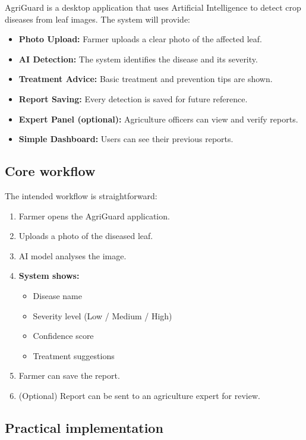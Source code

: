 \documentclass[11pt,a4paper]{article}
\begin{document}
AgriGuard is a desktop application that uses Artificial Intelligence to detect crop diseases from leaf images.
The system will provide:

\begin{itemize}[leftmargin=0.6cm]

    \item \textbf{Photo Upload:} Farmer uploads a clear photo of the affected leaf.
    \item \textbf{AI Detection:} The system identifies the disease and its severity.
    \item \textbf{Treatment Advice:} Basic treatment and prevention tips are shown.
    \item \textbf{Report Saving:} Every detection is saved for future reference.
    \item \textbf{Expert Panel (optional):} Agriculture officers can view and verify reports.
    \item \textbf{Simple Dashboard:} Users can see their previous reports.

\end{itemize}

\subsection{Core workflow}

The intended workflow is straightforward:
\begin{enumerate}
    \item Farmer opens the AgriGuard application.
    \item Uploads a photo of the diseased leaf.
    \item AI model analyses the image.
    \item \textbf{System shows:}
    \begin{itemize}
        \item Disease name
        \item Severity level (Low / Medium / High)
        \item Confidence score
        \item Treatment suggestions
    \end{itemize}
    \item Farmer can save the report.
    \item (Optional) Report can be sent to an agriculture expert for review.
\end{enumerate}



\subsection{Practical implementation}
\end{document}
